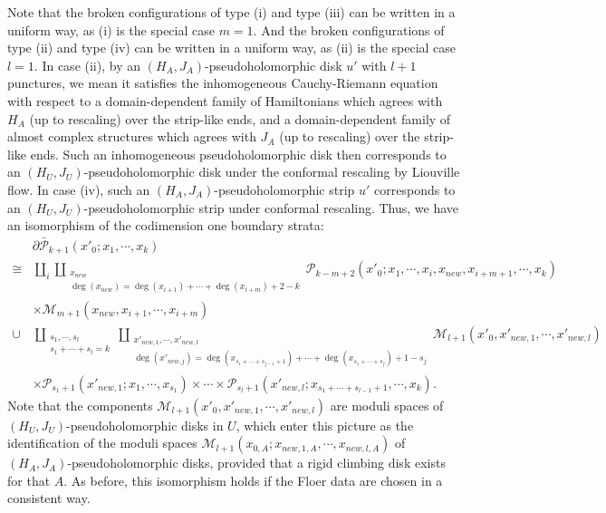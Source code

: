 \documentclass{amsart}
\numberwithin{equation}{section}
\numberwithin{figure}{section}
\begin{document}
Note that the broken configurations of type (i) and type (iii) can be written in a uniform way, as (i) is the special case $m = 1$. And the broken configurations of type (ii) and type (iv) can be written in a uniform way, as (ii) is the special case $l = 1$.
In case (ii), by an $(H_{A}, J_{A})$-pseudoholomorphic disk $u'$ with $l+1$ punctures, we mean it satisfies the inhomogeneous Cauchy-Riemann equation with respect to a domain-dependent family of Hamiltonians which agrees with $H_{A}$ (up to rescaling) over the strip-like ends, and a domain-dependent family of almost complex structures which agrees with $J_{A}$ (up to rescaling) over the strip-like ends. Such an inhomogeneous pseudoholomorphic disk then corresponds to an $(H_{U}, J_{U})$-pseudoholomorphic disk under the conformal rescaling by Liouville flow.
In case (iv), such an $(H_{A}, J_{A})$-pseudoholomorphic strip $u'$ corresponds to an $(H_{U}, J_{U})$-pseudoholomorphic strip under conformal rescaling. 
Thus, we have an isomorphism of the codimension one boundary strata:
\begin{equation}\label{boundary strata of moduli space of climbing disks}
\begin{split}
&\partial \bar{\mathcal{P}}_{k+1}(x'_{0}; x_{1}, \cdots, x_{k})\\
\cong & \coprod_{i} \coprod_{\substack{x_{new}\\ \deg(x_{new}) = \deg(x_{i+1}) + \cdots + \deg(x_{i+m}) + 2 - k}} \mathcal{P}_{k-m+2}(x'_{0}; x_{1}, \cdots, x_{i}, x_{new}, x_{i+m+1}, \cdots, x_{k})\\
& \times \mathcal{M}_{m+1}(x_{new}, x_{i+1}, \cdots, x_{i+m})\\
\cup & \coprod_{\substack{s_{1}, \cdots, s_{l}\\s_{1} + \cdots + s_{l} = k}}
\coprod_{\substack{x'_{new, 1}, \cdots, x'_{new, l}\\ \deg(x'_{new, j}) = \deg(x_{s_{1}+\cdots+s_{j-1}+1}) + \cdots + \deg(x_{s_{1}+\cdots+s_{j}}) + 1 - s_{j}}}
\mathcal{M}_{l+1}(x'_{0}, x'_{new, 1}, \cdots, x'_{new, l})\\
& \times \mathcal{P}_{s_{1}+1}(x'_{new, 1}; x_{1}, \cdots, x_{s_{1}}) \times \cdots \times \mathcal{P}_{s_{l}+1}(x'_{new, l}; x_{s_{1}+\cdots+s_{l-1}+1}, \cdots, x_{k}).
\end{split}
\end{equation}
Note that the components $\mathcal{M}_{l+1}(x'_{0}, x'_{new, 1}, \cdots, x'_{new, l})$ are moduli spaces of $(H_{U}, J_{U})$-pseudoholomorphic disks in $U$, which enter this picture as the identification of the moduli spaces $\mathcal{M}_{l+1}(x_{0, A}; x_{new, 1, A}, \cdots, x_{new, l, A})$ of $(H_{A}, J_{A})$-pseudoholomorphic disks, provided that a rigid climbing disk exists for that $A$. As before, this isomorphism holds if the Floer data are chosen in a consistent way. \par
\end{document}
